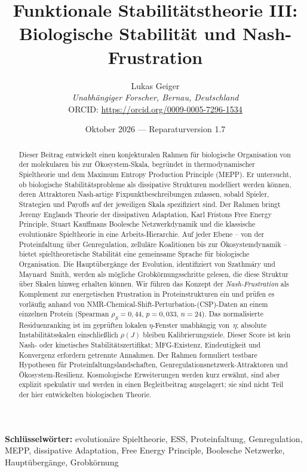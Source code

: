 \documentclass[12pt,a4paper]{article}
\title{Funktionale Stabilitätstheorie III: Biologische Stabilität und Nash-Frustration}
\author{Lukas Geiger\\
\textit{Unabhängiger Forscher, Bernau, Deutschland}\\
ORCID: \url{https://orcid.org/0009-0005-7296-1534}}
\date{Oktober 2026 --- Reparaturversion 1.7}
\theoremstyle{remark}
\begin{document}
\maketitle
\begin{abstract}
Dieser Beitrag entwickelt einen konjekturalen Rahmen für biologische Organisation von der molekularen bis zur Ökosystem-Skala, begründet in thermodynamischer Spieltheorie und dem Maximum Entropy Production Principle (MEPP). Er untersucht, ob biologische Stabilitätsprobleme als dissipative Strukturen modelliert werden können, deren Attraktoren Nash-artige Fixpunktbeschreibungen zulassen, sobald Spieler, Strategien und Payoffs auf der jeweiligen Skala spezifiziert sind. Der Rahmen bringt Jeremy Englands Theorie der dissipativen Adaptation, Karl Fristons Free Energy Principle, Stuart Kauffmans Boolesche Netzwerkdynamik und die klassische evolutionäre Spieltheorie in eine Arbeits-Hierarchie. Auf jeder Ebene -- von der Proteinfaltung über Genregulation, zelluläre Koalitionen bis zur Ökosystemdynamik -- bietet spieltheoretische Stabilität eine gemeinsame Sprache für biologische Organisation. Die Hauptübergänge der Evolution, identifiziert von Szathmáry und Maynard~Smith, werden als mögliche Grobkörnungsschritte gelesen, die diese Struktur über Skalen hinweg erhalten können. Wir führen das Konzept der \emph{Nash-Frustration} als Komplement zur energetischen Frustration in Proteinstrukturen ein und prüfen es vorläufig anhand von NMR-Chemical-Shift-Perturbation-(CSP)-Daten an einem einzelnen Protein (Spearman $\rho_S = 0{,}44$, $p = 0{,}033$, $n = 24$). Das normalisierte Residuenranking ist im geprüften lokalen $\eta$-Fenster unabhängig von~$\eta$; absolute Instabilitätsskalen einschließlich $\rho(J)$ bleiben Kalibrierungsziele. Dieser Score ist kein Nash- oder kinetisches Stabilitätszertifikat; MFG-Existenz, Eindeutigkeit und Konvergenz erfordern getrennte Annahmen. Der Rahmen formuliert testbare Hypothesen für Proteinfaltungslandschaften, Genregulationsnetzwerk-Attraktoren und Ökosystem-Resilienz. Kosmologische Erweiterungen werden kurz erwähnt, sind aber explizit spekulativ und werden in einen Begleitbeitrag ausgelagert; sie sind nicht Teil der hier entwickelten biologischen Theorie.
\end{abstract}

\textbf{Schlüsselwörter:} evolutionäre Spieltheorie, ESS, Proteinfaltung, Genregulation, MEPP, dissipative Adaptation, Free Energy Principle, Boolesche Netzwerke, Hauptübergänge, Grobkörnung

\clearpage
\tableofcontents
\clearpage
\end{document}
